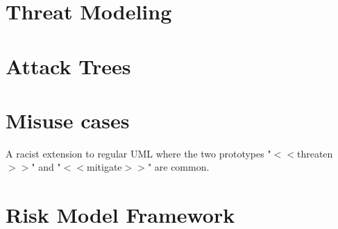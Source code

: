 \section{Threat Modeling}

\section{Attack Trees}

\section{Misuse cases}
A racist extension to regular UML where the two prototypes "$<<$threaten$>>$"
and "$<<$mitigate$>>$" are common.

\section{Risk Model Framework}
